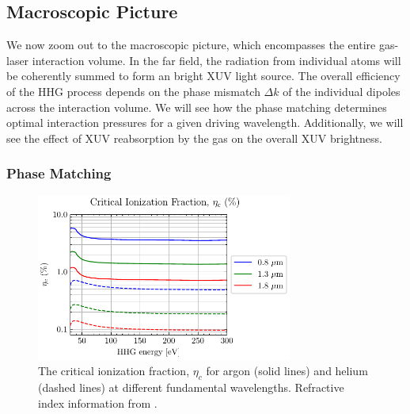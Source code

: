 \subsection{Macroscopic Picture}

We now zoom out to the macroscopic picture, which encompasses the entire gas-laser interaction volume. In the far field, the radiation from individual atoms will be coherently summed to form an bright XUV light source. The overall efficiency of the HHG process depends on the phase mismatch $\Delta k$ of the individual dipoles across the interaction volume. We will see how the phase matching determines optimal interaction pressures for a given driving wavelength. Additionally, we will see the effect of XUV reabsorption by the gas on the overall XUV brightness.

\subsubsection{Phase Matching}

\label{sec:phase-matching}

\begin{figure}
	\centering
	\includegraphics[width=0.75\textwidth]{figures/chap1/crit_ion_frac.pdf}
	\caption{The critical ionization fraction, $\eta_c$ for argon (solid lines) and helium (dashed lines) at different fundamental wavelengths. Refractive index information from \cite{gulliksonCXROXRayInteractions,peckDispersionArgon1964,mansfieldDispersionHelium1969}.}
	\label{fig:crit_ion_frac}
\end{figure}

